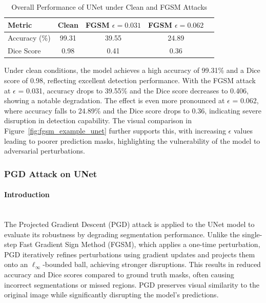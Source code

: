 \documentclass[../main.tex]{subfiles}
\begin{document}
\begin{table}[H]
\caption{Overall Performance of UNet under Clean and FGSM Attacks}
    \label{tab:unet_fgsm_overall_performance}
    \centering
    \footnotesize
    \begin{tabular}{@{\hspace{0.3cm}}lS[table-format=1.3]S[table-format=1.3]S[table-format=1.3]S[table-format=1.3]@{\hspace{0.3cm}}}
        \toprule
        \textbf{Metric} & {\textbf{Clean}} & {\textbf{FGSM $\epsilon=0.031$}} & {\textbf{FGSM $\epsilon=0.062$}}  \\
        \midrule
        Accuracy (\%)    & 99.31 & 39.55 & 24.89 \\
        Dice Score        & 0.98 & 0.41 & 0.36  \\
        \bottomrule
    \end{tabular}
\end{table}
Under clean conditions, the model achieves a high accuracy of 99.31\% and a Dice score of 0.98, reflecting excellent detection performance. With the FGSM attack at $\epsilon$ = 0.031, accuracy drops to 39.55\% and the Dice score decreases to 0.406, showing a notable degradation. The effect is even more pronounced at $\epsilon$ = 0.062, where accuracy falls to 24.89\% and the Dice score drops to 0.36, indicating severe disruption in detection capability. The visual comparison in Figure~\ref{fig:fgsm_example_unet} further supports this, with increasing $\epsilon$ values leading to poorer prediction masks, highlighting the vulnerability of the model to adversarial perturbations.

\subsubsection{PGD Attack on UNet}

\paragraph{Introduction}\leavevmode\\
The Projected Gradient Descent (PGD) \cite{madry2018towardspgd} attack is applied to the UNet model to evaluate its robustness by degrading segmentation performance. Unlike the single-step Fast Gradient Sign Method (FGSM), which applies a one-time perturbation, PGD iteratively refines perturbations using gradient updates and projects them onto an $\ell_\infty$-bounded ball, achieving stronger disruptions. This results in reduced accuracy and Dice scores compared to ground truth masks, often causing incorrect segmentations or missed regions. PGD preserves visual similarity to the original image while significantly disrupting the model’s predictions.
\end{document}
